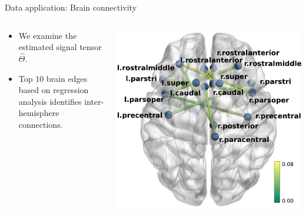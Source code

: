 \documentclass[10pt, mathserif]{beamer} %
\theoremstyle{definition}
\theoremstyle{plain}
\begin{document}
\begin{frame}{Data application: Brain connectivity}
\begin{columns}
\begin{column}{0.6\textwidth}
 \begin{itemize}
     \item We examine the estimated signal tensor $\hat\Theta.$
     \item Top 10 brain edges based on regression analysis identifies inter-hemisphere connections.
 \end{itemize}
\end{column}
\begin{column}{0.4\textwidth} 
   \begin{center}
     \includegraphics[width=\textwidth]{Figures/brainIQ.pdf}
     \end{center}
\end{column}
\end{columns}

\end{frame}
\end{document}
